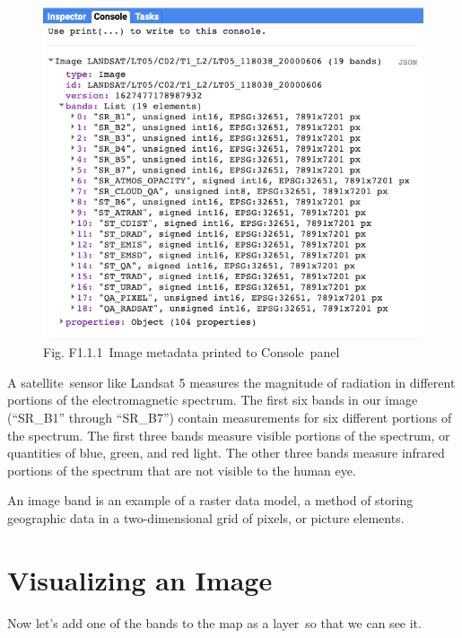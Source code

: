 \documentclass[
  letterpaper,
  DIV=11,
  numbers=noendperiod]{scrreprt}
\begin{document}
\begin{figure}

{\centering \includegraphics{./F1/image66.png}

}

\caption{Fig. F1.1.1~Image metadata printed to Console~panel}

\end{figure}

A satellite~sensor like Landsat 5 measures the magnitude of radiation in
different portions of the electromagnetic spectrum. The first six bands
in our image (``SR\_B1'' through ``SR\_B7'') contain measurements for
six different portions of the spectrum. The first three bands measure
visible portions of the spectrum, or quantities of blue, green, and red
light. The other three bands measure infrared portions of the spectrum
that are not visible to the human eye.

An image band is an example of a raster data model, a method of storing
geographic data in a two-dimensional grid of pixels, or picture
elements.

\hypertarget{visualizing-an-image}{%
\section{Visualizing an Image}\label{visualizing-an-image}}

Now let's add one of the bands to the map as a layer~so that we can see
it. ~
\end{document}
